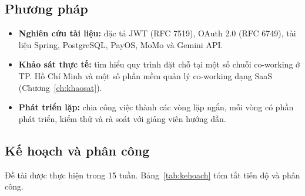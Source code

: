 \subsection{Phương pháp}
\begin{itemize}
    \item \textbf{Nghiên cứu tài liệu:} đặc tả JWT (RFC 7519), OAuth 2.0 (RFC 6749), tài liệu Spring, PostgreSQL, PayOS, MoMo và Gemini API.
    \item \textbf{Khảo sát thực tế:} tìm hiểu quy trình đặt chỗ tại một số chuỗi co-working ở TP. Hồ Chí Minh và một số phần mềm quản lý co-working dạng SaaS (Chương~\ref{ch:khaosat}).
    \item \textbf{Phát triển lặp:} chia công việc thành các vòng lặp ngắn, mỗi vòng có phần phát triển, kiểm thử và rà soát với giảng viên hướng dẫn.
\end{itemize}

\subsection{Kế hoạch và phân công}
Đề tài được thực hiện trong 15 tuần. Bảng~\ref{tab:kehoach} tóm tắt tiến độ và phân công.


